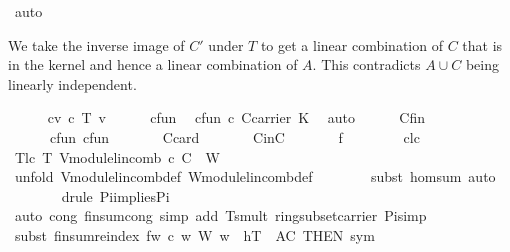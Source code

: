 \begin{isabellebody}
\ auto%
\begin{isamarkuptxt}%
We take the inverse image of $C'$ under $T$ to get a linear combination of $C$ that is 
in the kernel and hence a linear combination of $A$. This contradicts $A\cup C$ being linearly
independent.%
\end{isamarkuptxt}%
\isamarkuptrue%
\ \ \ \ \isamarkupfalse%
\ {\isacharquery}c{\isacharequal}{\isachardoublequoteopen}{\isasymlambda}v{\isachardot}\ c{\isacharprime}\ {\isacharparenleft}T\ v{\isacharparenright}{\isachardoublequoteclose}\isanewline
\ \ \ \ \isamarkupfalse%
\ c{\isacharprime}fun\ \isamarkupfalse%
\ c{\isacharunderscore}fun{\isacharcolon}\ {\isachardoublequoteopen}{\isacharquery}c{\isasymin}\ C{\isasymrightarrow}carrier\ K{\isachardoublequoteclose}\ \isamarkupfalse%
\ auto\isanewline
\ \ \ \ \isamarkupfalse%
\ Cfin\ \isanewline
\ \ \ \ \ \ c{\isacharunderscore}fun\ c{\isacharprime}fun\ \isanewline
\ \ \ \ \ \ C{\isacharprime}{\isacharunderscore}card\ \isanewline
\ \ \ \ \ \ CinC\ \isanewline
\ \ \ \ \ \ f\ \ \isanewline
\ \ \ \ \ \ c{\isacharprime}lc\ \isanewline
\ \ \ \ \isamarkupfalse%
\ T{\isacharunderscore}lc{\isacharunderscore}{}{\isacharcolon}\ {\isachardoublequoteopen}T\ {\isacharparenleft}V{\isachardot}module{\isachardot}lincomb\ {\isacharquery}c\ C{\isacharparenright}\ {\isacharequal}\ {\isasymzero}\isactrlbsub W\isactrlesub {\isachardoublequoteclose}\isanewline
\ \ \ \ \ \ \isamarkupfalse%
\ {\isacharparenleft}unfold\ V{\isachardot}module{\isachardot}lincomb{\isacharunderscore}def\ W{\isachardot}module{\isachardot}lincomb{\isacharunderscore}def{\isacharparenright}\isanewline
\ \ \ \ \ \ \isamarkupfalse%
\ {\isacharparenleft}subst\ hom{\isacharunderscore}sum{\isacharcomma}\ auto{\isacharparenright}\isanewline
\ \ \ \ \ \ \isamarkupfalse%
\ {\isacharparenleft}drule\ Pi{\isacharunderscore}implies{\isacharunderscore}Pi{}{\isacharparenright}{\isacharplus}\isanewline
\ \ \ \ \ \ \isamarkupfalse%
\ {\isacharparenleft}auto\ cong{\isacharcolon}\ finsum{\isacharunderscore}cong\ simp\ add{\isacharcolon}\ T{\isacharunderscore}smult\ ring{\isacharunderscore}subset{\isacharunderscore}carrier\ Pi{\isacharunderscore}simp{\isacharparenright}\isanewline
\ \ \ \ \ \ \isamarkupfalse%
\ {\isacharparenleft}subst\ finsum{\isacharunderscore}reindex{\isacharbrackleft}\ {\isacharquery}f{\isacharequal}{\isachardoublequoteopen}{\isasymlambda}w{\isachardot}\ c{\isacharprime}\ w\ {\isasymodot}\isactrlbsub W\isactrlesub \ w{\isachardoublequoteclose}\ \ {\isacharquery}h{\isacharequal}{\isachardoublequoteopen}T{\isachardoublequoteclose}\ \ {\isacharquery}A{\isacharequal}{\isachardoublequoteopen}C{\isachardoublequoteclose}{\isacharcomma}\ THEN\ sym{\isacharbrackright}{\isacharparenright}\isanewline

\end{isabellebody}
